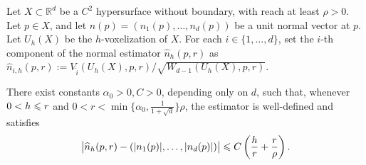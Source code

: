 \begin{corollary}%
\label{cor:cubical-normal-estimation}
Let $X\subset\mathbb R^d$ be a $C^2$ hypersurface without boundary,
with reach at least $\rho>0$.  Let $p\in X$, and let
$n(p)=(n_1(p),\ldots,n_d(p))$ be a unit normal vector at $p$.  Let
$U_h(X)$ be the $h$-voxelization of $X$.  For each
$i\in\{1,\ldots,d\}$, set the $i$-th component of the normal estimator
$\widehat{n}_{h}(p,r)$ as $\widehat{n}_{i,h}(p,r):=
V_{\widehat{i}}(U_h(X),p,r)/\sqrt{W_{d-1}(U_h(X),p,r)}$.
 
There exist constants $\alpha_0>0,C>0$, depending only on $d$, such
that, whenever $0 < h \leqslant r$ and $0 < r < \min \{ \alpha_0,
\frac{1}{1+\sqrt{d}} \} \rho$, the estimator is well-defined and
satisfies
\[
\big|\widehat{n}_h(p,r)-(|n_1(p)|,\ldots,|n_d(p)|)\big|
\leqslant C \left(\frac{h}{r}+\frac{r}{\rho} \right).
\]
\end{corollary}

